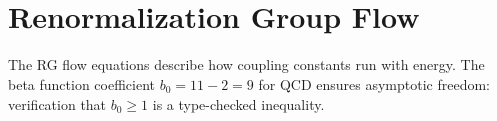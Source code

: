 \documentclass[11pt,a4paper]{book}
\begin{document}
\begin{code}
\>[0]\AgdaSpace{}%
\AgdaSpace{}%
\AgdaSymbol{(}\AgdaSpace{}%
\AgdaSymbol{:}\AgdaSpace{}%
\AgdaSymbol{)}\AgdaSpace{}%
\AgdaSymbol{:}\AgdaSpace{}%
\AgdaSpace{}%
\<%
\\
\>[0][@{}l@{\AgdaIndent{0}}]%
\>[2]\<%
\\
\>[2][@{}l@{\AgdaIndent{0}}]%
\>[4]\AgdaSpace{}%
\AgdaSymbol{:}\AgdaSpace{}%
\AgdaSymbol{(}\AgdaSpace{}%
\AgdaSymbol{:}\AgdaSpace{}%
\AgdaSymbol{)}\AgdaSpace{}%
\AgdaSymbol{(}\AgdaSpace{}%
\AgdaSpace{}%
\AgdaSymbol{:}\AgdaSpace{}%
\AgdaSymbol{)}\AgdaSpace{}%
\AgdaSpace{}%
\<%
\end{code}

\section{Renormalization Group Flow}
\label{sec:rg-flow}

The RG flow equations describe how coupling constants run with energy. The beta function coefficient $b_0 = 11 - 2 = 9$ for QCD ensures asymptotic freedom: verification that $b_0 \geq 1$ is a type-checked inequality.
\end{document}
